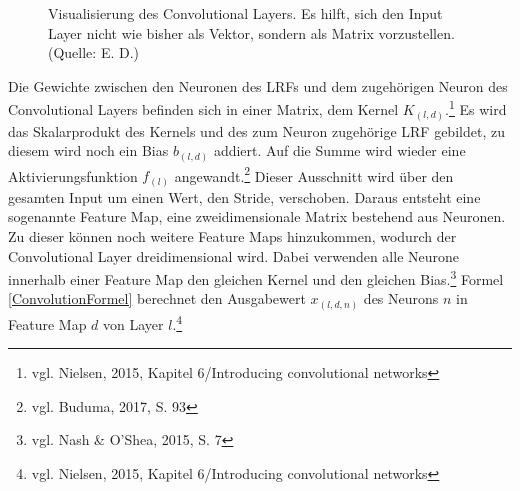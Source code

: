\documentclass[a4paper,12pt,ngerman,oneside]{scrreprt}	%
\newcommand{\fundamentals}[1]{vgl. Buduma, 2017, S. {#1}}
\newcommand{\cnnKlein}[1]{vgl. Nash \& O'Shea, 2015, S. {#1}}
\begin{document}
\begin{figure}
				\caption{Visualisierung des Convolutional Layers. Es hilft, sich den Input Layer nicht wie bisher als Vektor, sondern als Matrix vorzustellen. (Quelle: E. D.)}\label{LRF}
			\end{figure}
			Die Gewichte zwischen den Neuronen des LRFs und dem zugehörigen Neuron des Convolutional Layers befinden sich in einer Matrix, dem Kernel $K_{(l,d)}$.\footnote{vgl. Nielsen, 2015, Kapitel 6/Introducing convolutional networks} Es wird das Skalarprodukt des Kernels und des zum Neuron zugehörige LRF gebildet, zu diesem wird noch ein Bias $b_{(l,d)}$ addiert. Auf die Summe wird wieder eine Aktivierungsfunktion $f_{(l)}$ angewandt.\footnote{\fundamentals{93}}
			Dieser Ausschnitt wird über den gesamten Input um einen Wert, den Stride, verschoben. Daraus entsteht eine sogenannte Feature Map, eine zweidimensionale Matrix bestehend aus Neuronen. Zu dieser können noch weitere Feature Maps hinzukommen, wodurch der Convolutional Layer dreidimensional wird. Dabei verwenden alle Neurone innerhalb einer Feature Map den gleichen Kernel und den gleichen Bias.\footnote{\cnnKlein{7}} Formel \ref{ConvolutionFormel} berechnet den Ausgabewert $x_{(l,d,n)}$ des Neurons $n$ in Feature Map $d$ von Layer $l$.\footnote{vgl. Nielsen, 2015, Kapitel 6/Introducing convolutional networks}
			
\end{document}
